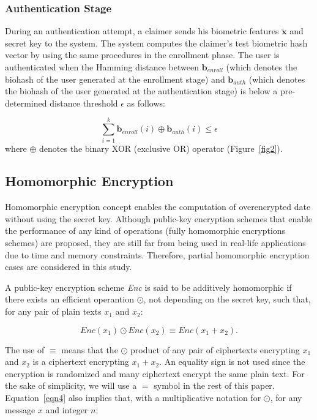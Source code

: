 \documentclass[conference]{IEEEtran}
\begin{document}
\subsubsection{Authentication Stage}

During an authentication attempt, a claimer sends his biometric features
$\tilde{\textbf{x}}$ and secret key to the system. The system computes the claimer's test biometric hash
vector by using the same procedures in the enrollment phase. The
user is authenticated when the Hamming distance between
$\mathbf{b}_{enroll}$ (which denotes the biohash of the user
generated at the enrollment stage) and $\mathbf{b}_{auth}$ (which
denotes the biohash of the user generated at the authentication
stage) is below a pre-determined distance threshold $\epsilon$ as
follows:

\begin{equation}
\sum^{k}_{i=1}\mathbf{b}_{enroll}\left(i\right)\oplus\mathbf{b}_{auth}\left(i\right)\leq\epsilon
\end{equation}
where $\oplus$ denotes the binary XOR (exclusive OR) operator (Figure~\ref{fig2}).


\subsection{Homomorphic Encryption}

Homomorphic encryption concept enables the computation of overencrypted date without using the secret key. Although public-key encryption schemes that enable the performance of any kind of operations (fully homomorphic encryptions schemes) are proposed, they are still far from being used in real-life applications due to time and memory constraints. Therefore, partial homomorphic encryption cases are considered in this study.

A public-key encryption scheme \emph{Enc} is said to be additively homomorphic if there exists an efficient operantion $\odot$, not depending on the secret key, such that, for any pair of plain texts $x_1$ and $x_2$:

\begin{equation}
Enc(x_1)\odot Enc(x_2)\equiv Enc(x_1 + x_2).
\label{eqn4}
\end{equation}

The use of $\equiv$ means that the $\odot$ product of any pair of ciphertexts encrypting $x_1$ and $x_2$ is a ciphertext encrypting $x_1 + x_2$. An equality sign is not used since the encryption is randomized and many ciphertext encrypt the same plain text. For the sake of simplicity, we will use a $=$ symbol in the rest of this paper. Equation~\ref{eqn4} also implies that, with a multiplicative notation for $\odot$, for any message $x$ and integer $n$:
\end{document}
